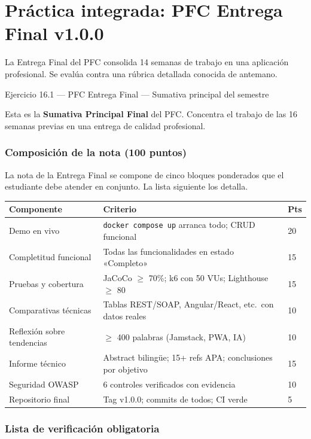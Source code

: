 \section{Práctica integrada: PFC Entrega Final v1.0.0}

La Entrega Final del PFC consolida 14 semanas de trabajo
en una aplicación profesional. Se evalúa contra una rúbrica
detallada conocida de antemano.


\begin{cajaejercicio}{Ejercicio 16.1 --- PFC Entrega Final --- Sumativa principal del semestre}

Esta es la \textbf{Sumativa Principal Final} del PFC. Concentra el
trabajo de las 16 semanas previas en una entrega de calidad
profesional.

\subsubsection*{Composición de la nota (100 puntos)}

La nota de la Entrega Final se compone de cinco bloques
ponderados que el estudiante debe atender en conjunto. La lista
siguiente los detalla.


\begin{tabularx}{\textwidth}{lXl}
\toprule
\textbf{Componente} & \textbf{Criterio} & \textbf{Pts}\\
\midrule
Demo en vivo & \texttt{docker compose up} arranca todo; CRUD funcional & 20 \\
Completitud funcional & Todas las funcionalidades en estado «Completo» & 15 \\
Pruebas y cobertura & JaCoCo $\geq$ 70\%; k6 con 50 VUs; Lighthouse $\geq$ 80 & 15 \\
Comparativas técnicas & Tablas REST/SOAP, Angular/React, etc.\ con datos reales & 10 \\
Reflexión sobre tendencias & $\geq$ 400 palabras (Jamstack, PWA, IA) & 10 \\
Informe técnico & Abstract bilingüe; 15+ refs APA; conclusiones por objetivo & 15 \\
Seguridad OWASP & 6 controles verificados con evidencia & 10 \\
Repositorio final & Tag v1.0.0; commits de todos; CI verde & 5 \\
\bottomrule
\end{tabularx}

\subsubsection*{Lista de verificación obligatoria}


\end{cajaejercicio}
